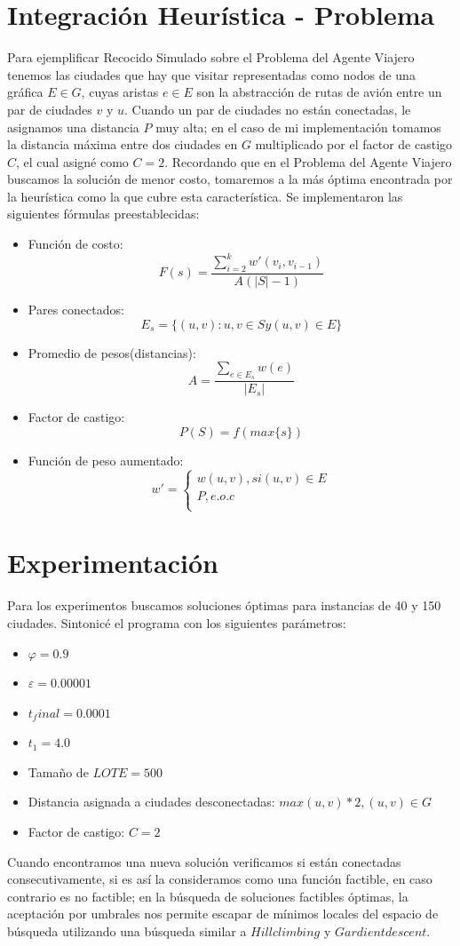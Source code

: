 \documentclass[a4paper]{article}
\begin{document}
\section{Integración Heurística -  Problema}
Para ejemplificar Recocido Simulado sobre el Problema del Agente Viajero tenemos las ciudades que hay que visitar representadas como nodos de una gráfica $E \in G$, cuyas aristas $e \in E$ son la abstracción de rutas de avión entre un par de ciudades $v$ y $u$. Cuando un par de ciudades no están conectadas, le asignamos una distancia $P$ muy alta; en el caso de mi implementación tomamos la distancia máxima entre dos ciudades en $G$ multiplicado por el factor de castigo $C$, el cual asigné como $C = 2$. Recordando que en el Problema del Agente Viajero buscamos la solución de menor costo, tomaremos a la más óptima encontrada por la heurística como la que cubre esta característica.
Se implementaron las siguientes fórmulas preestablecidas:
\begin{itemize}
\item  Función de costo:
\[F(s) = \frac{\sum_{i =2}^{k} w'(v_i , v_{i-1})}{A(|S| - 1)}\]
\item Pares conectados:
\[E_s = \{(u, v): u, v \in S y (u, v) \in E\}\]
\item Promedio de pesos(distancias):
\[A = \frac{\sum_{e \in E_s} w(e)}{|E_s|}\]
\item Factor de castigo:
\[P(S) = f(max\{s\})\]
\item Función de peso aumentado:
\[w' = \begin{cases}
      w(u, v), si (u, v) \in E \\
      {P,      e.o.c} \\

   \end{cases}
\]
\end{itemize}

\section{Experimentación}

Para los experimentos buscamos soluciones óptimas para instancias de 40 y 150 ciudades.
Sintonicé el programa con los siguientes parámetros:
\begin{itemize}
\item $\varphi = 0.9$
\item $\varepsilon = 0.00001$
\item $t_final = 0.0001$
\item $t_1 = 4.0$
\item Tamaño de $LOTE = 500$
\item Distancia asignada a ciudades desconectadas: $max(u, v) * 2, (u, v) \in G$
\item Factor de castigo: $C = 2$
\end{itemize}
Cuando encontramos una nueva solución verificamos si están conectadas consecutivamente, si es así la consideramos como una función factible, en caso contrario es no factible; en la búsqueda de soluciones factibles óptimas, la aceptación por umbrales nos permite escapar de mínimos locales del espacio de búsqueda utilizando una búsqueda similar a $Hill climbing$ y $Gardient descent$.
\end{document}
